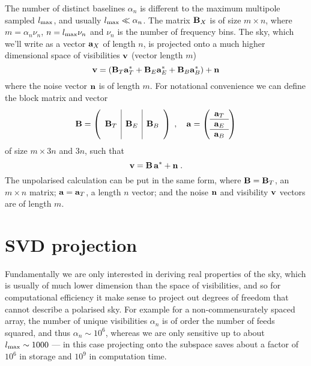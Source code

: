 \documentclass[prd,twocolumn,nofootinbib]{revtex4}
\begin{document}
The number of distinct baselines $\alpha_n$ is different to the
maximum multipole sampled $l_{\text{max}}$, and usually $l_{\text{max}} \ll \alpha_n$. The matrix
$\mathbf{B}_X$ is of size $m \times n$, where $m = \alpha_n \nu_n$, $n = l_{\text{max}} \nu_n$
and $\nu_n$ is the number of frequency bins. The sky, which we'll write as a
vector $\mathbf{a}_X$ of length $n$, is projected onto a much higher dimensional space
of visibilities $\mathbf{v}$ (vector length $m$)
\begin{equation}
\mathbf{v} = \left(\mathbf{B}_T \mathbf{a}_T^* + \mathbf{B}_E \mathbf{a}_E^* + \mathbf{B}_B \mathbf{a}_B^* \right) + \mathbf{n}
\end{equation}
where the noise vector $\mathbf{n}$ is of length $m$. For notational convenience we can
define the block matrix and vector
\begin{equation}
\mathbf{B} = \left(\begin{array}{c|c|c} & & \\ \mathbf{B}_T & \mathbf{B}_E & \mathbf{B}_B \\ &
    &\end{array}\right)
\;, \quad
\mathbf{a} = \left(\begin{array}{c} \mathbf{a}_T \\ \hline \mathbf{a}_E \\ \hline
    \mathbf{a}_B\end{array}\right)
\end{equation}
of size $m \times 3 n$ and $3 n$, such that
\begin{equation}
\label{eq:matnot}
\mathbf{v} = \mathbf{B}\, \mathbf{a}^* + \mathbf{n} \; .
\end{equation}
The unpolarised calculation can be put in the same form, where $\mathbf{B} = \mathbf{B}_T$, an
$m \times n$ matrix; $\mathbf{a} = \mathbf{a}_T$, a length $n$ vector; and the noise $\mathbf{n}$ and
visibility $\mathbf{v}$ vectors are of length $m$.

\section{SVD projection}

Fundamentally we are only interested in deriving real properties of the sky,
which is usually of much lower dimension than the space of visibilities, and so
for computational efficiency it make sense to project out degrees of freedom
that cannot describe a polarised sky. For example for a non-commensurately
spaced array, the number of unique visibilities $\alpha_n$ is of order the
number of feeds squared, and thus $\alpha_n \sim 10^6$, whereas we are only
sensitive up to about $l_{\text{max}} \sim 1000$ --- in this case projecting onto the
subspace saves about a factor of $10^6$ in storage and $10^9$ in computation
time.
\end{document}
